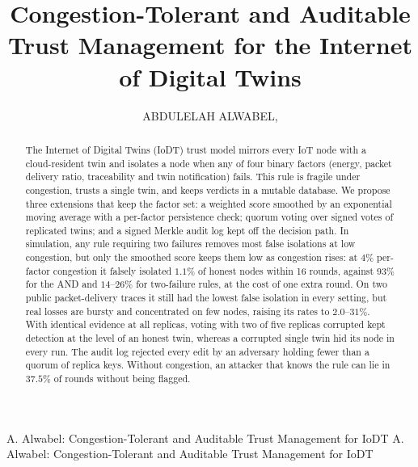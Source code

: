 


\title{Congestion-Tolerant and Auditable Trust Management for the
Internet of Digital Twins}

\author{\uppercase{Abdulelah Alwabel}, 
}

\address[1]{Department of Computer Sciences,
    College of Computer Engineering and Sciences,
    Prince Sattam bin Abdulaziz University,
    Al-Kharj, Saudi Arabia}


\markboth
{A. Alwabel: Congestion-Tolerant and Auditable Trust Management for IoDT}
{A. Alwabel: Congestion-Tolerant and Auditable Trust Management for IoDT}


\begin{abstract}
The Internet of Digital Twins (IoDT) trust model mirrors every IoT node
with a cloud-resident twin and isolates a node when any of four binary
factors (energy, packet delivery ratio, traceability and twin
notification) fails.  This rule is fragile under congestion, trusts a
single twin, and keeps verdicts in a mutable database.  We propose
three extensions that keep the factor set: a weighted score smoothed by
an exponential moving average with a per-factor persistence check;
quorum voting over signed votes of replicated twins; and a signed
Merkle audit log kept off the decision path.  In simulation, any rule
requiring two failures removes most false isolations at low
congestion, but only the smoothed score keeps them low as congestion
rises: at $4\%$ per-factor congestion it falsely isolated $1.1\%$ of
honest nodes within 16 rounds, against $93\%$ for the AND and
$14$--$26\%$ for two-failure rules, at the cost of one extra round.
On two public packet-delivery traces it still had the lowest false
isolation in every setting, but real losses are bursty and
concentrated on few nodes, raising its rates to $2.0$--$31\%$.  With
identical evidence at all replicas, voting with two of five replicas
corrupted kept detection at the level of an honest twin,
whereas a corrupted single twin hid its node in every run.  The audit
log rejected every edit by an adversary holding fewer than a quorum of
replica keys.  Without congestion, an attacker that knows the rule can
lie in $37.5\%$ of rounds without being flagged.
\end{abstract}

